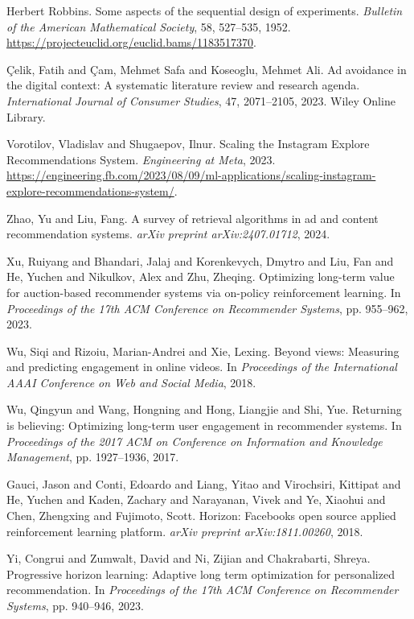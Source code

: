 \begin{thebibliography}{99}
 Herbert Robbins. {S}ome aspects of the sequential design of experiments. \textit{Bulletin of the American Mathematical Society}, 58, 527--535, 1952. \url{https://projecteuclid.org/euclid.bams/1183517370}.

 {\c C}elik, Fatih and {\c C}am, Mehmet Safa and Koseoglu, Mehmet Ali. {A}d avoidance in the digital context: {A} systematic literature review and research agenda. \textit{International Journal of Consumer Studies}, 47, 2071--2105, 2023. Wiley Online Library.

 Vorotilov, Vladislav and Shugaepov, Ilnur. {S}caling the {I}nstagram {E}xplore {R}ecommendations {S}ystem. \textit{Engineering at Meta}, 2023. \url{https://engineering.fb.com/2023/08/09/ml-applications/scaling-instagram-explore-recommendations-system/}.

 Zhao, Yu and Liu, Fang. {A} survey of retrieval algorithms in ad and content recommendation systems. \textit{arXiv preprint arXiv:2407.01712}, 2024.

 Xu, Ruiyang and Bhandari, Jalaj and Korenkevych, Dmytro and Liu, Fan and He, Yuchen and Nikulkov, Alex and Zhu, Zheqing. {O}ptimizing long-term value for auction-based recommender systems via on-policy reinforcement learning. In \textit{Proceedings of the 17th ACM Conference on Recommender Systems}, pp. 955--962, 2023.

 Wu, Siqi and Rizoiu, Marian-Andrei and Xie, Lexing. {B}eyond views: {M}easuring and predicting engagement in online videos. In \textit{Proceedings of the International AAAI Conference on Web and Social Media}, 2018.

 Wu, Qingyun and Wang, Hongning and Hong, Liangjie and Shi, Yue. {R}eturning is believing: {O}ptimizing long-term user engagement in recommender systems. In \textit{Proceedings of the 2017 ACM on Conference on Information and Knowledge Management}, pp. 1927--1936, 2017.

 Gauci, Jason and Conti, Edoardo and Liang, Yitao and Virochsiri, Kittipat and He, Yuchen and Kaden, Zachary and Narayanan, Vivek and Ye, Xiaohui and Chen, Zhengxing and Fujimoto, Scott. {H}orizon: {F}acebook\textquotesingle s open source applied reinforcement learning platform. \textit{arXiv preprint arXiv:1811.00260}, 2018.

 Yi, Congrui and Zumwalt, David and Ni, Zijian and Chakrabarti, Shreya. {P}rogressive horizon learning: {A}daptive long term optimization for personalized recommendation. In \textit{Proceedings of the 17th ACM Conference on Recommender Systems}, pp. 940--946, 2023.


\end{thebibliography}
